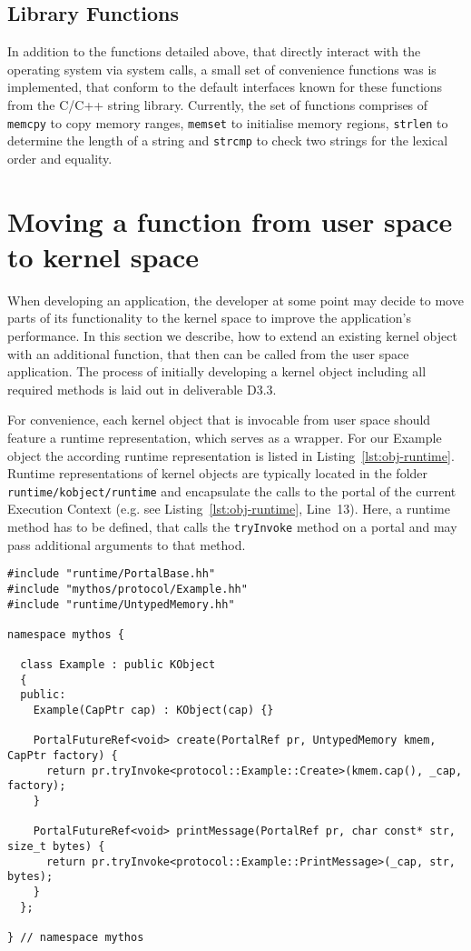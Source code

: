 \subsection{Library Functions} In addition to the functions detailed above, that
directly interact with the operating system via system calls, a small set of
convenience functions was is implemented, that conform to the default interfaces
known for these functions from the C/C++ string library. Currently, the set of
functions comprises of \texttt{memcpy} to copy memory ranges, \texttt{memset} to
initialise memory regions, \texttt{strlen} to determine the length of a string
and \texttt{strcmp} to check two strings for the lexical order and equality.

\section{Moving a function from user space to kernel space}
\label{sec:objects}

When developing an application, the developer at some point may decide to move
parts of its functionality to the kernel space to improve the application's
performance. In this section we describe, how to extend an existing kernel
object with an additional function, that then can be called from the user space
application. The process of initially developing a kernel object including all
required methods is laid out in deliverable D3.3.

For convenience, each kernel object that is invocable from user space should
feature a runtime representation, which serves as a wrapper.  For our Example
object the according runtime representation is listed in
Listing~\ref{lst:obj-runtime}. Runtime representations of kernel objects are
typically located in the folder \texttt{runtime/kobject/runtime} and
encapsulate the calls to the portal of the current Execution Context (e.g. see
Listing~\ref{lst:obj-runtime}, Line~13). Here, a runtime method has to be
defined, that calls the \texttt{tryInvoke} method on a portal and may pass
additional arguments to that method.

\lstset{language=c++,caption=Object's Runtime Representation,label=lst:obj-runtime}
\begin{lstlisting}
#include "runtime/PortalBase.hh"
#include "mythos/protocol/Example.hh"
#include "runtime/UntypedMemory.hh"

namespace mythos {

  class Example : public KObject
  {
  public:
    Example(CapPtr cap) : KObject(cap) {}

    PortalFutureRef<void> create(PortalRef pr, UntypedMemory kmem, CapPtr factory) {
      return pr.tryInvoke<protocol::Example::Create>(kmem.cap(), _cap, factory);
    }

    PortalFutureRef<void> printMessage(PortalRef pr, char const* str, size_t bytes) {
      return pr.tryInvoke<protocol::Example::PrintMessage>(_cap, str, bytes);
    }
  };

} // namespace mythos
\end{lstlisting}

